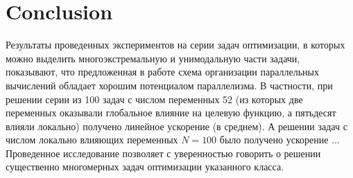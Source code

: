 \documentclass{svproc}
\begin{document}
\section{Conclusion}

Результаты проведенных экспериментов на серии задач оптимизации, в которых можно выделить многоэкстремальную и унимодальную части задачи, показывают, что предложенная в работе схема организации параллельных вычислений обладает хорошим потенциалом параллелизма. 
В частности, при решении серии из 100 задач с числом переменных 52 (из которых две переменных оказывали глобальное влияние на целевую функцию, а пятьдесят влияли локально) получено линейное ускорение (в среднем). 
А решении задач с числом локально влияющих переменных $N=100$ было получено ускорение ...
Проведенное исследование позволяет с уверенностью говорить о решении существенно многомерных задач оптимизации указанного класса.



%
%

{}
\end{document}
